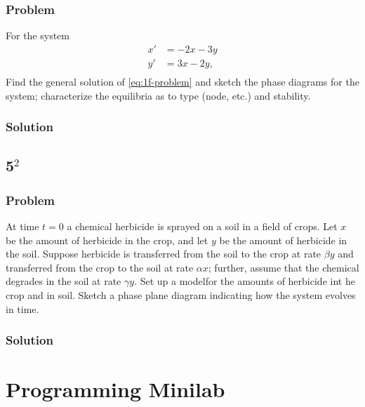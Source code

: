 \documentclass[12pt]{article}
\begin{document}
\subsubsection*{Problem}
For the system
\begin{equation}
  \label{eq:1f-problem}
  \begin{aligned}
    x'&=-2x-3y\\
    y'&=3x-2y,\\
  \end{aligned}
\end{equation}
Find the general solution of \cref{eq:1f-problem} and sketch the phase diagrams
for the system; characterize the equilibria as to type (node, etc.) and
stability.
\subsubsection*{Solution} \todo[]

\subsection{5$^2$}
\subsubsection*{Problem}
At time $t=0$ a chemical herbicide is sprayed on a soil in a field of crops. Let
$x$ be the amount of herbicide in the crop, and let $y$ be the amount of
herbicide in the soil. Suppose herbicide is transferred from the soil to the
crop at rate $\beta y$ and transferred from the crop to the soil at rate $\alpha
x$; further, assume that the chemical degrades in the soil at rate $\gamma y$.
Set up a modelfor the amounts of herbicide int he crop and in soil. Sketch a
phase plane diagram indicating how the system evolves in time.
\subsubsection*{Solution}
\todo[]

\section{Programming Minilab}
\todo[]
\end{document}
